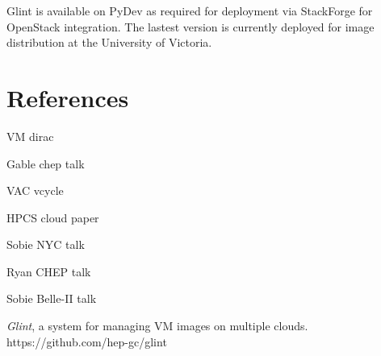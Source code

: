 \documentclass[a4paper]{jpconf}
\begin{document}
Glint is available on PyDev as required for deployment via StackForge for OpenStack integration. The lastest version is currently deployed for image distribution at the University of Victoria. 


\section*{References}
\begin{thebibliography}{9}

VM dirac

Gable chep talk

VAC vcycle

HPCS cloud paper

Sobie NYC talk

Ryan CHEP talk

Sobie Belle-II talk


{\it Glint}, a system for managing VM images on multiple clouds.
https://github.com/hep-gc/glint

\end{thebibliography}
\end{document}
